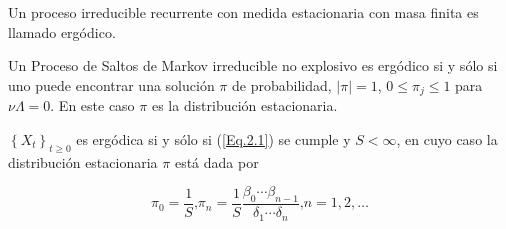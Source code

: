 \begin{Def}
Un proceso irreducible recurrente con medida estacionaria con masa
finita es llamado erg\'odico.
\end{Def}

\begin{Teo}\label{Teo4.3}
Un Proceso de Saltos de Markov irreducible no explosivo es
erg\'odico si y s\'olo si uno puede encontrar una soluci\'on
$\pi$ de probabilidad, $|\pi|=1$, $0\leq\pi_{j}\leq1$ para
$\nu\Lambda=0$. En este caso $\pi$ es la distribuci\'on
estacionaria.
\end{Teo}

\begin{Col}\label{Corolario2.4}
$\left\{X_{t}\right\}_{t\geq0}$ es erg\'odica si y s\'olo si
(\ref{Eq.2.1}) se cumple y $S<\infty$, en cuyo caso la
distribuci\'on estacionaria $\pi$ est\'a dada por

\begin{equation}\label{Eq.2.4}
\pi_{0}=\frac{1}{S}\textrm{,
}\pi_{n}=\frac{1}{S}\frac{\beta_{0}\cdots\beta_{n-1}}{\delta_{1}\cdots\delta_{n}}\textrm{,
}n=1,2,\ldots
\end{equation}
\end{Col}


